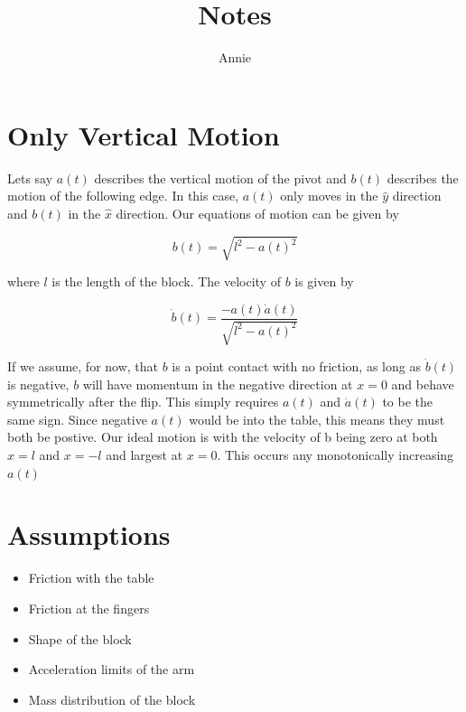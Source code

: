\documentclass{article}
\begin{document}
\title{Notes}
\author{Annie}
\maketitle


\providecommand{\abs}[1]{\left\vert#1\right\vert}
\providecommand{\norm}[1]{\left\Vert#1\right\Vert}

\section{Only Vertical Motion}

Lets say $a(t)$ describes the vertical motion of the pivot and $b(t)$ describes the motion of the following edge. In this case, $a(t)$ only moves in the $\hat{y}$ direction and $b(t)$ in the $\hat{x}$ direction. Our equations of motion can be given by 

\begin{equation}\label{eq:b}
b(t) = \sqrt{l^2 - a(t)^2}
\end{equation}

where $l$ is the length of the block. The velocity of $b$ is given by 

\begin{equation}\label{eq:db}
\dot{b}(t) = \frac{-a(t)\dot{a}(t)}{\sqrt{l^2 - a(t)^2}}
\end{equation}

If we assume, for now, that $b$ is a point contact with no friction, as long as $\dot{b}(t)$ is negative, $b$ will have momentum in the negative direction at $x=0$ and behave symmetrically after the flip. This simply requires $a(t)$ and $\dot{a}(t)$ to be the same sign. Since negative $a(t)$ would be into the table, this means they must both be postive. Our ideal motion is with the velocity of b being zero at both $x=l$ and $x=-l$ and largest at $x=0$. This occurs any monotonically increasing $a(t)$

\section{Assumptions}

\begin{itemize}

  \item Friction with the table
  \item Friction at the fingers
  \item Shape of the block
  \item Acceleration limits of the arm
  \item Mass distribution of the block

\end{itemize}
\end{document}

